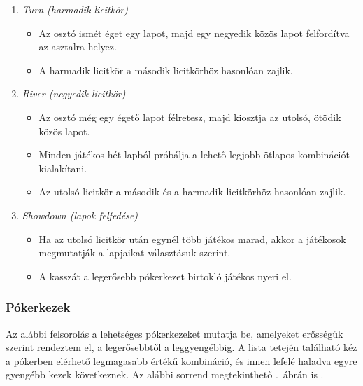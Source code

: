 \documentclass[]{thesis-ekf}
\theoremstyle{definition}
\theoremstyle{remark}
\begin{document}
\begin{enumerate}
\begin{itemize}
	\end{itemize}
	\item \emph{Turn (harmadik licitkör)}
	\begin{itemize}
		\item Az osztó ismét éget egy lapot, majd egy negyedik közös lapot felfordítva az asztalra helyez.
		\item A harmadik licitkör a második licitkörhöz hasonlóan zajlik.
	\end{itemize}
	\item \emph{River (negyedik licitkör)}
	\begin{itemize}
		\item Az osztó még egy égető lapot félretesz, majd kiosztja az utolsó, ötödik közös lapot.
		\item Minden játékos hét lapból próbálja a lehető legjobb ötlapos kombinációt kialakítani.
		\item Az utolsó licitkör a második és a harmadik licitkörhöz hasonlóan zajlik.
	\end{itemize}
	\item \emph{Showdown (lapok felfedése)}
	\begin{itemize}
		\item Ha az utolsó licitkör után egynél több játékos marad, akkor a játékosok megmutatják a lapjaikat választásuk szerint.
		\item A kasszát a legerősebb pókerkezet birtokló játékos nyeri el.
	\end{itemize}
\end{enumerate}

\subsubsection{Pókerkezek}

Az alábbi felsorolás a lehetséges pókerkezeket mutatja be, amelyeket erősségük szerint rendeztem el, a legerősebbtől a leggyengébbig. A lista tetején található kéz a pókerben elérhető legmagasabb értékű kombináció, és innen lefelé haladva egyre gyengébb kezek következnek. Az alábbi sorrend megtekinthető .~ábrán is \cite[9.~oldal]{Szurdi}.
\end{document}
